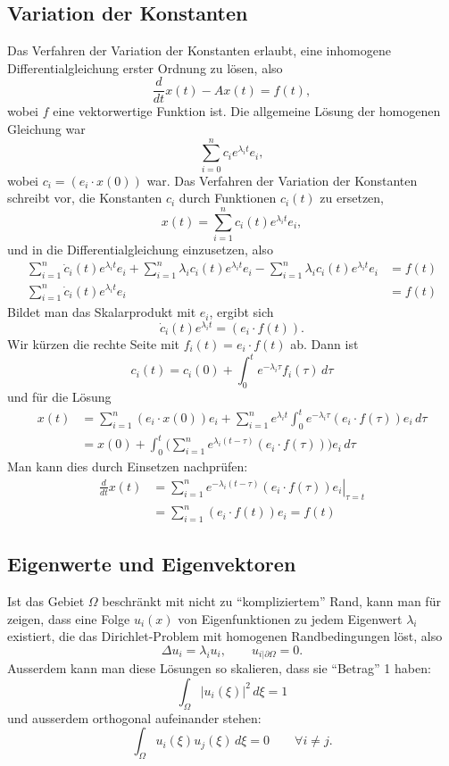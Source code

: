 \subsection{Variation der Konstanten}
Das Verfahren der Variation der Konstanten erlaubt, eine inhomogene
Differentialgleichung erster Ordnung zu lösen, also
\[
\frac{d}{dt}x(t)-Ax(t)=f(t),
\]
wobei $f$ eine vektorwertige Funktion ist.
Die allgemeine Lösung der homogenen Gleichung war
\[
\sum_{i=0}^nc_ie^{\lambda_i t}e_i,
\]
wobei $c_i=(e_i\cdot x(0))$ war.
Das Verfahren der Variation der Konstanten schreibt vor, die Konstanten
$c_i$ durch Funktionen $c_i(t)$ zu ersetzen,
\[
x(t)=\sum_{i=1}^nc_i(t)e^{\lambda_it}e_i,
\]
und in die Differentialgleichung
einzusetzen, also
\begin{align*}
\sum_{i=1}^n\dot c_i(t)e^{\lambda_it}e_i
+
\sum_{i=1}^n\lambda_i c_i(t)e^{\lambda_it}e_i
-\sum_{i=1}^n\lambda_i c_i(t)e^{\lambda_it}e_i
&=
f(t)
\\
\sum_{i=1}^n\dot c_i(t)e^{\lambda_it}e_i
&=
f(t)
\end{align*}
Bildet man das Skalarprodukt mit $e_i$, ergibt sich 
\[
\dot c_i(t)e^{\lambda_i t}=(e_i\cdot f(t)).
\]
Wir kürzen die rechte Seite mit $f_i(t)=e_i\cdot f(t)$ ab.
Dann ist
\[
c_i(t)=c_i(0)+\int_0^te^{-\lambda_i \tau}f_i(\tau)\,d\tau
\]
und für die Lösung
\begin{align*}
x(t)&=
\sum_{i=1}^n
(e_i\cdot x(0))e_i+
\sum_{i=1}^ne^{\lambda_i t}\int_0^te^{-\lambda_i \tau}(e_i\cdot f(\tau))e_i\,d\tau
\\
&=
x(0)
+
\int_0^t
\biggl(
\sum_{i=1}^n
e^{\lambda_i(t- \tau)}(e_i\cdot f(\tau))\biggr)e_i\,d\tau
\end{align*}
Man kann dies durch Einsetzen nachprüfen:
\begin{align*}
\frac{d}{dt}x(t)
&=
\sum_{i=1}^n\left.e^{-\lambda_i (t-\tau)}(e_i\cdot f(\tau))e_i \right|_{\tau=t}
\\
&=
\sum_{i=1}^n(e_i\cdot f(t))e_i=f(t)
\end{align*}

\subsection{Eigenwerte und Eigenvektoren}
Ist das Gebiet $\Omega$ beschränkt mit nicht zu ``kompliziertem'' Rand,
kann man für zeigen, dass eine Folge $u_i(x)$
von Eigenfunktionen zu jedem Eigenwert $\lambda_i$ existiert,
die das Dirichlet-Problem mit homogenen
Randbedingungen löst, also
\[
\Delta u_i=\lambda_iu_i,\qquad u_{i|\partial\Omega} = 0.
\]
Ausserdem kann man diese Lösungen so skalieren, dass sie ``Betrag'' 1 haben:
\[
\int_{\Omega}|u_i(\xi)|^2\,d\xi=1
\]
und ausserdem orthogonal aufeinander stehen:
\[
\int_{\Omega}u_i(\xi)u_j(\xi)\,d\xi=0\qquad\forall i\ne j.
\]

